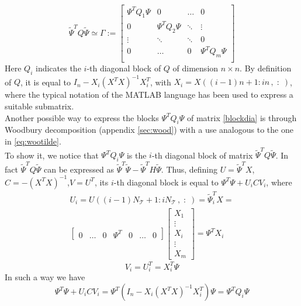 \begin{equation}
	\label{blockdia}
	\tilde{\Psi}^TQ\tilde{\Psi}\simeq \Gamma :=
	\begin{bmatrix}
		\Psi^TQ_1\Psi & 0             & \dots  & 0             \\
		0             & \Psi^TQ_2\Psi & \ddots & \vdots        \\
		\vdots        & \ddots        & \ddots & 0             \\
		0             & \dots         & 0      & \Psi^TQ_m\Psi \\
	\end{bmatrix}
\end{equation}
Here $Q_i$ indicates the $i$-th diagonal block of $Q$ of dimension $n
	\times n$. By definition of $Q$, it is equal to
$I_n-X_i\left(X^TX\right)^{-1}X_i^T$, with $X_i=X\left(\left(i-1\right)n+1 :
	in\,, \;:\; \right)$, where the typical notation of the MATLAB language has
been used to express a suitable submatrix.\\ Another possible way to express
the blocks $\Psi^TQ_i\Psi$ of matrix \ref{blockdia} is through Woodbury
decomposition (appendix \ref{sec:wood}) with a use analogous to the one in
\ref{eq:wootilde}.\\ To show it, we notice that $\Psi^TQ_i\Psi$ is the $i$-th
diagonal block of matrix $\tilde{\Psi}^TQ\tilde{\Psi}$. In fact
$\tilde{\Psi}^TQ\tilde{\Psi}$ can be expressed as
$\tilde{\Psi}^T\tilde{\Psi}-\tilde{\Psi}^TH\tilde{\Psi}$. Thus, defining $U =
	\tilde{\Psi}^TX$, $C = -\left(X^TX\right)^{-1}$,$V =U^T$, its $i$-th diagonal
block is equal to $\Psi^T\Psi + U_iCV_i $, where
\begin{equation}
	\begin{split}
		U_i = U\left(\left(i-1\right)N_\mathcal{T}+1 : iN_\mathcal{T}\,, \;:\;\right) = \tilde{\Psi}^T_iX =\\
		\begin{bmatrix}
			0 & \dots & 0 & \Psi^T & 0 & \dots & 0
		\end{bmatrix}
		\begin{bmatrix}
			X_1    \\
			\vdots \\
			X_i    \\
			\vdots \\
			X_m
		\end{bmatrix}
		= \Psi^T X_i
	\end{split}
\end{equation}
\begin{equation}
	V_i = U_i^T = X^T_i\Psi
\end{equation}
In such a way we have
\begin{equation}
	\Psi^T\Psi +  U_iCV_i = \Psi^T \left( I_n-X_i\left(X^TX\right)^{-1}X_i^T \right) \Psi = \Psi^T Q_i \Psi
\end{equation}

